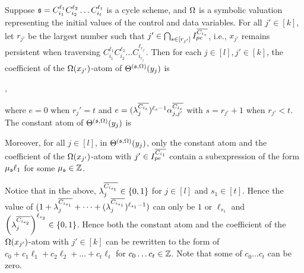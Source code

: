\begin{lemma}\label{prop-cycle-schm}
Suppose ${\mathfrak{s} }=C_{i_1}^{\ell_1} C_{i_2}^{\ell_2} \dots C_{i_t}^{\ell_t}$ is a cycle scheme, and $\Omega$ is a symbolic valuation representing the initial values of the control and data variables. 
For all $j'\in[k]$, let $r_{j'}$ be the largest number such that $j'\in\bigcap_{s\in[r_{j'}]} I^{\overline{C_{i_{s}}}}_{pe}$, i.e., $x_{j'}$ remains persistent when traversing $C_{i_1}^{\ell_1} C_{i_2}^{\ell_2} \dots C_{i_{r_j}}^{\ell_{r_{j'}}}$.
Then for each $j\in [l], j' \in[k]$, the coefficient of the $\Omega(x_{j'})$-atom of $\Theta^{({\mathfrak{s} },\Omega)}(y_j)$ is 
\begin{center}
,
\end{center}
where $e=0$ when $r_j'=t$ and $e=(\lambda^{\overline{C_{i_s}}}_{j})^{\ell_s-1} \alpha^{\overline{C_{i_{s}}}}_{j,j'}$ with $s=r_{j'}+1$ when $r_{j'}<t$.\\
The constant atom of $\Theta^{({\mathfrak{s} },\Omega)}(y_j)$ is 
\begin{center}
\end{center}
Moreover, for all $j \in [l]$, in $\Theta^{({\mathfrak{s} },\Omega)}(y_j)$, only the constant atom and the coefficient of the $\Omega(x_{j'})$-atom with $j' \in  I^{\overline{C_{i_{1}}}}_{pe}$ contain a subexpression of the form $ \mu_{\mathfrak{s} } \ell_1$ for some $\mu_{\mathfrak{s} }\in {\mathbb{Z} }$.
\end{lemma}
Notice that in the above, $\lambda^{\overline{C_{i_{s_1}}}}_j\in\{0,1\}$ for $j\in[l]$ and $s_1\in [t]$. Hence the value of $(1+\lambda^{\overline{C_{i_{s_1}}}}_{j} + \dots + (\lambda^{\overline{C_{i_{s_1}}}}_{j})^{\ell_{s_1}-1} )$ can only be $1$ or $\ell_{s_1}$ and $\left(\lambda^{\overline{C_{i_{s_2}}}}_{j}\right)^{\ell_{s_2}}\in\{0,1\}$.
Hence both the constant atom and the coefficient of the $\Omega(x_{j'})$-atom with $j'\in [k]$ can be rewritten to the form of $c_0+c_1\ell_1+c_2\ell_2+\dots+c_t\ell_t$ for $c_0\ldots c_t\in {\mathbb{Z} }$. Note that some of $c_0\ldots c_t$ can be zero.




